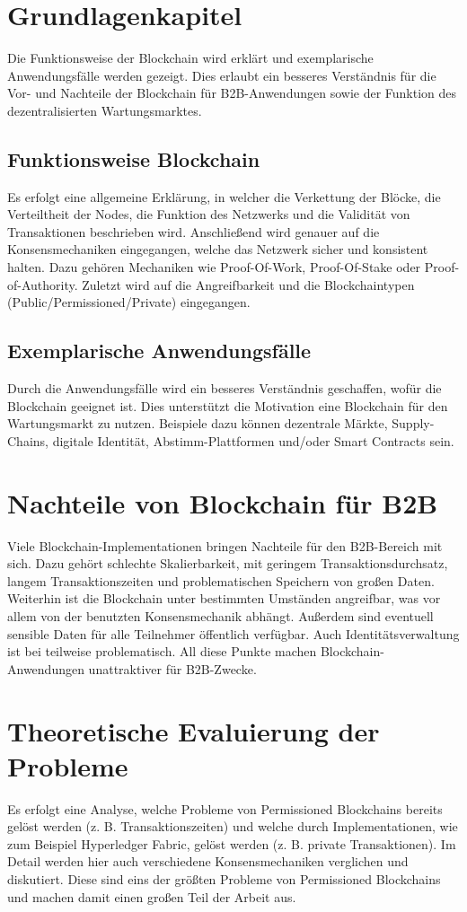 \documentclass{llncs}
\begin{document}
\section{Grundlagenkapitel}
Die Funktionsweise der Blockchain wird erklärt und exemplarische Anwendungsfälle werden gezeigt. Dies erlaubt ein besseres Verständnis für die Vor- und Nachteile der Blockchain für B2B-Anwendungen sowie der Funktion des dezentralisierten Wartungsmarktes.

\subsection{Funktionsweise Blockchain}
Es erfolgt eine allgemeine Erklärung, in welcher die Verkettung der Blöcke, die Verteiltheit der Nodes, die Funktion des Netzwerks und die Validität von Transaktionen beschrieben wird. Anschließend wird genauer auf die Konsensmechaniken eingegangen, welche das Netzwerk sicher und konsistent halten. Dazu gehören Mechaniken wie Proof-Of-Work, Proof-Of-Stake oder Proof-of-Authority. Zuletzt wird auf die Angreifbarkeit und die Blockchaintypen (Public/Permissioned/Private) eingegangen.

\subsection{Exemplarische Anwendungsfälle}
Durch die Anwendungsfälle wird ein besseres Verständnis geschaffen, wofür die Blockchain geeignet ist. Dies unterstützt die Motivation eine Blockchain für den Wartungsmarkt zu nutzen. Beispiele dazu können dezentrale Märkte, Supply-Chains, digitale Identität, Abstimm-Plattformen und/oder Smart Contracts sein.

\section{Nachteile von Blockchain für B2B}
Viele Blockchain-Implementationen bringen Nachteile für den B2B-Bereich mit sich. Dazu gehört schlechte Skalierbarkeit, mit geringem Transaktionsdurchsatz, langem Transaktionszeiten und problematischen Speichern von großen Daten. Weiterhin ist die Blockchain unter bestimmten Umständen angreifbar, was vor allem von der benutzten Konsensmechanik abhängt. Außerdem sind eventuell sensible Daten für alle Teilnehmer öffentlich verfügbar. Auch Identitätsverwaltung ist bei teilweise problematisch. All diese Punkte machen Blockchain-Anwendungen unattraktiver für B2B-Zwecke.

\section{Theoretische Evaluierung der Probleme}
Es erfolgt eine Analyse, welche Probleme von Permissioned Blockchains bereits gelöst werden (z. B. Transaktionszeiten) und welche durch Implementationen, wie zum Beispiel Hyperledger Fabric, gelöst werden (z. B. private Transaktionen). Im Detail werden hier auch verschiedene Konsensmechaniken verglichen und diskutiert. Diese sind eins der größten Probleme von Permissioned Blockchains und machen damit einen großen Teil der Arbeit aus.
\end{document}
